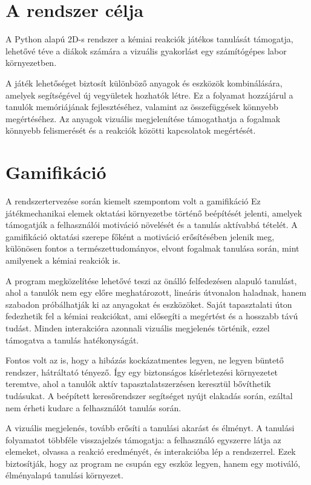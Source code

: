 \documentclass[]{thesis-ekf}
\begin{document}
	\section{A rendszer célja}
	
	A Python alapú 2D-s rendszer a kémiai reakciók játékos tanulását támogatja, lehetővé téve a diákok számára a vizuális gyakorlást egy számítógépes labor környezetben. 
	
	A játék lehetőséget biztosít különböző anyagok és eszközök kombinálására, amelyek segítségével új vegyületek hozhatók létre. Ez a folyamat hozzájárul a tanulók memóriájának fejlesztéséhez, valamint az összefüggések könnyebb megértéséhez. Az anyagok vizuális megjelenítése támogathatja a fogalmak könnyebb felismerését és a reakciók	közötti kapcsolatok megértését.
	
	\section{Gamifikáció}
	
	A rendszertervezése során kiemelt szempontom volt a gamifikáció\cite{Gamifikacio} Ez játékmechanikai elemek oktatási környezetbe történő beépítését jelenti, amelyek támogatják a felhasználói motiváció növelését és a tanulás aktívabbá tételét. A gamifikáció\cite{Gamifikacio2} oktatási szerepe főként a motiváció erősítésében jelenik meg, különösen fontos a természettudományos, elvont fogalmak tanulása során, mint amilyenek a kémiai reakciók is.
	
	A program megközelítése lehetővé teszi az önálló felfedezésen alapuló tanulást, ahol a tanulók nem egy előre meghatározott, lineáris útvonalon haladnak, hanem szabadon próbálhatják ki az anyagokat és eszközöket. Saját tapasztalati úton fedezhetik fel a kémiai reakciókat, ami elősegíti a megértést és a hosszabb távú tudást. Minden interakcióra azonnali vizuális megjelenés történik, ezzel támogatva a tanulás hatékonyságát.
	
	Fontos volt az is, hogy a hibázás kockázatmentes legyen, ne legyen büntető rendszer, hátráltató tényező. Így egy biztonságos kísérletezési környezetet teremtve, ahol a tanulók aktív tapasztalatszerzésen keresztül bővíthetik tudásukat. A beépített keresőrendszer segítséget nyújt  elakadás során, ezáltal nem érheti kudarc a felhasználót tanulás során.
	
	A vizuális megjelenés, tovább erősíti a tanulási akarást és élményt. A tanulási folyamatot többféle visszajelzés támogatja: a felhasználó egyszerre látja az elemeket,
	olvassa a reakció eredményét, és interakcióba lép a rendszerrel. Ezek biztosítják, hogy az program ne csupán egy eszköz legyen, hanem egy motiváló, élményalapú tanulási környezet.
	
\end{document}
